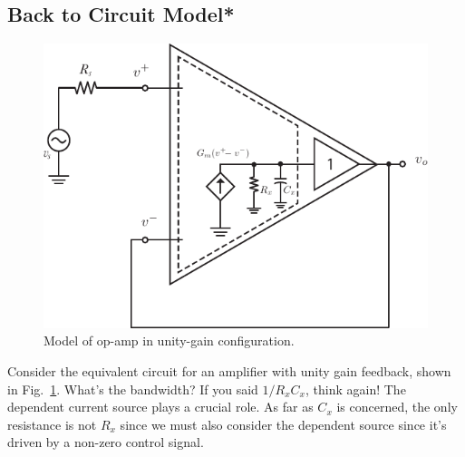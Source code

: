 \subsection{Back to Circuit Model*}
\begin{figure}[tb]
\begin{center}
\includegraphics[scale=1]{opamp_model_fb_unity}
\end{center}
\caption{Model of op-amp in unity-gain configuration.}
\label{fig:opamp_model_fb_unity}
\end{figure}

Consider the equivalent circuit for an amplifier with unity gain feedback, shown in Fig.~\ref{fig:opamp_model_fb_unity}.  What's the bandwidth?  If you said $1/R_x C_x$, think again!  The dependent current source plays a crucial role.  As far as $C_x$ is concerned, the only resistance is not $R_x$ since we must also consider the dependent source since it's driven by a non-zero control signal.
